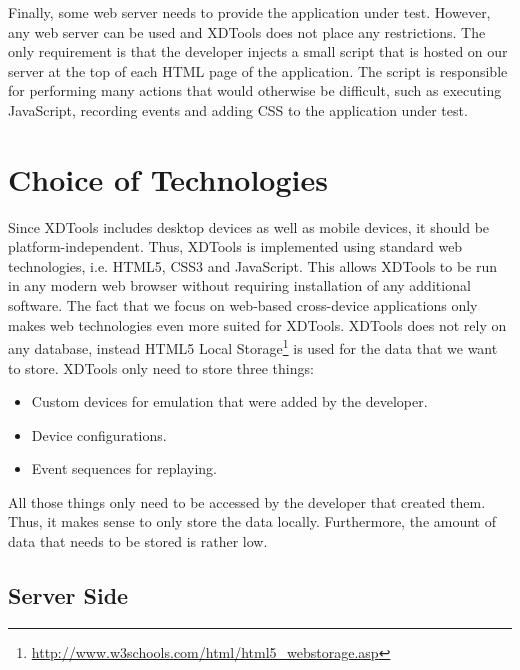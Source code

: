 Finally, some web server needs to provide the application under test. However, any web server can be used and XDTools does not place any restrictions. The only requirement is that the developer injects a small script that is hosted on our server at the top of each HTML page of the application. The script is responsible for performing many actions that would otherwise be difficult, such as executing JavaScript, recording events and adding CSS to the application under test.

\section{Choice of Technologies}

Since XDTools includes desktop devices as well as mobile devices, it should be platform-independent. Thus, XDTools is implemented using standard web technologies, i.e. HTML5, CSS3 and JavaScript. This allows XDTools to be run in any modern web browser without requiring installation of any additional software. The fact that we focus on web-based cross-device applications only makes web technologies even more suited for XDTools. XDTools does not rely on any database, instead HTML5 Local Storage\footnote{\url{http://www.w3schools.com/html/html5_webstorage.asp}} is used for the data that we want to store. XDTools only need to store three things:
\begin{itemize}
	\item Custom devices for emulation that were added by the developer.
	\item Device configurations.
	\item Event sequences for replaying.
\end{itemize}
All those things only need to be accessed by the developer that created them. Thus, it makes sense to only store the data locally. Furthermore, the amount of data that needs to be stored is rather low. 

\subsection{Server Side}


